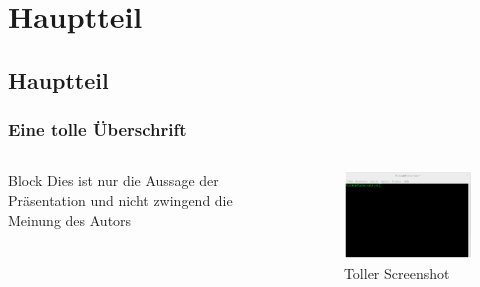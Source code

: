 \section{Hauptteil}

\subsection*{Hauptteil}

\begin{frame}
	\frametitle{Eine tolle Überschrift}
	\begin{columns}[c]
		\column[c]{5.6cm}
		\begin{exampleblock}{Block}
			\glqq Dies ist nur die Aussage der Präsentation und nicht zwingend die Meinung des Autors\grqq
		\end{exampleblock}
		\column{8cm}
		\begin{figure}[ht]
			\includegraphics[width=7cm]{Bilder/bild.png}\caption{Toller Screenshot}
		\end{figure}
	\end{columns}
\end{frame}
